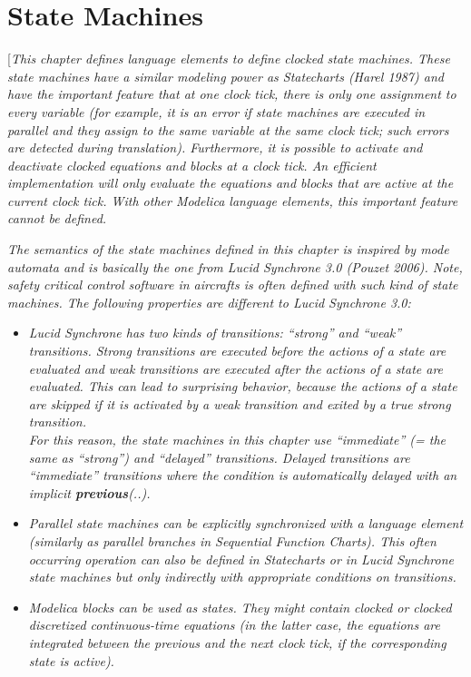 \documentclass[10pt,a4paper]{report}
\def\doublelabel#1{\label{#1}}
\begin{document}
\chapter{State Machines}\doublelabel{state-machines}

{[}\emph{This chapter defines language elements to define clocked state
machines. These state machines have a similar modeling power as
Statecharts (Harel 1987) and have the important feature that at one
clock tick, there is only one assignment to every variable (for example,
it is an error if state machines are executed in parallel and they
assign to the same variable at the same clock tick; such errors are
detected during translation). Furthermore, it is possible to activate
and deactivate clocked equations and blocks at a clock tick. An
efficient implementation will only evaluate the equations and blocks
that are active at the current clock tick. With other Modelica language
elements, this important feature cannot be defined.}

\emph{The semantics of the state machines defined in this chapter is
inspired by mode automata and is basically the one from Lucid Synchrone
3.0 (Pouzet 2006). Note, safety critical control software in aircrafts
is often defined with such kind of state machines. The following
properties are different to Lucid Synchrone 3.0:}

\begin{itemize}
\item
  \emph{Lucid Synchrone has two kinds of transitions: ``strong'' and
  ``weak'' transitions. Strong transitions are executed before the
  actions of a state are evaluated and weak transitions are executed
  after the actions of a state are evaluated. This can lead to
  surprising behavior, because the actions of a state are skipped if it
  is activated by a weak transition and exited by a true strong
  transition.\\
  For this reason, the state machines in this chapter use ``immediate''
  (= the same as ``strong'') and ``delayed'' transitions. Delayed
  transitions are ``immediate'' transitions where the condition is
  automatically delayed with an implicit \textbf{previous}(..). }
\item
  \emph{Parallel state machines can be explicitly synchronized with a
  language element (similarly as parallel branches in Sequential
  Function Charts). This often occurring operation can also be defined
  in Statecharts or in Lucid Synchrone state machines but only
  indirectly with appropriate conditions on transitions.}
\item
  \emph{Modelica blocks can be used as states. They might contain
  clocked or clocked discretized continuous-time equations (in the
  latter case, the equations are integrated between the previous and the
  next clock tick, if the corresponding state is active).}
\end{itemize}
\end{document}
